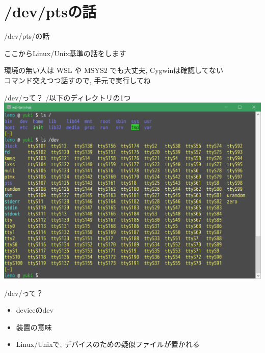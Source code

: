 \documentclass[uplatex, dvipdfmx, unicode]{beamer}
\begin{document}
\section{/dev/ptsの話}

\begin{frame}
  \Huge{\alert{/dev/pts/の話}}
\end{frame}

\begin{frame}
  \Large{\alert{ここからLinux/Unix基準の話をします}\faLinux} \\
  \vspace{0.2in}

  \normalsize
  環境の無い人は WSL や MSYS2 でも大丈夫, Cygwinは確認してない \\
  コマンド交えつつ話すので, 手元で実行してね
\end{frame}

\begin{frame}{/dev/って？}
  /以下のディレクトリの1つ \\
  \vspace{0.2in}
  \includegraphics[keepaspectratio, scale=.5]{./img/dev.png}
\end{frame}

\begin{frame}{/dev/って？}
  \begin{itemize}
    \item{\alert{dev}iceのdev}
    \item{装置の意味}
    \item{Linux/Unixで, デバイスのための疑似ファイルが置かれる}
  \end{itemize}
\end{frame}
\end{document}
